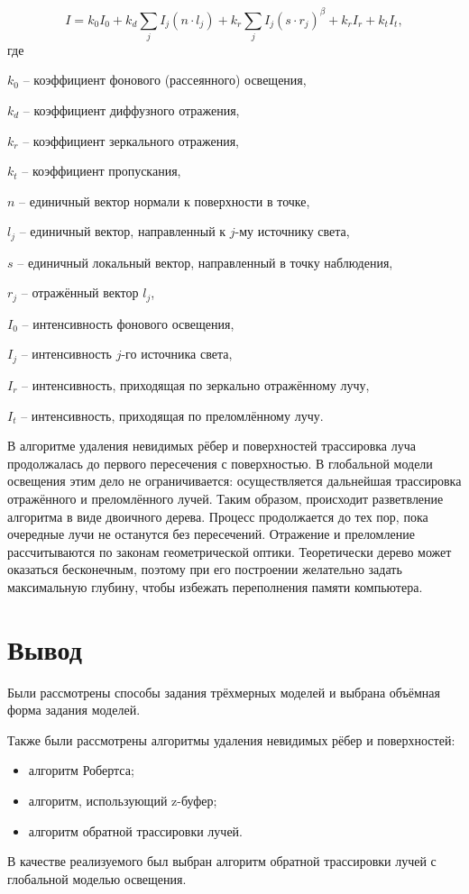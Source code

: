 \begin{equation}
	I = k_0I_0 + k_d\sum\limits_{j}^{}I_j(n \cdot l_j) + k_r\sum\limits_{j}^{}I_j(s \cdot r_j)^{\beta}+k_rI_r+k_tI_t,
\end{equation}
где

$k_0$ -- коэффициент фонового (рассеянного) освещения,

$k_d$ -- коэффициент диффузного отражения,

$k_r$ -- коэффициент зеркального отражения,

$k_t$ -- коэффициент пропускания,

$n$ -- единичный вектор нормали к поверхности в точке,

$l_j$ -- единичный вектор, направленный к $j$-му источнику света,

$s$ -- единичный локальный вектор, направленный в точку наблюдения,

$r_j$ -- отражённый вектор $l_j$,

$I_0$ -- интенсивность фонового освещения,

$I_j$ -- интенсивность $j$-го источника света,

$I_r$ --  интенсивность, приходящая по зеркально отражённому лучу,

$I_t$ -- интенсивность, приходящая по преломлённому лучу.

В алгоритме удаления невидимых рёбер и поверхностей трассировка луча продолжалась до первого пересечения с поверхностью. В глобальной модели освещения этим дело не ограничивается: осуществляется дальнейшая трассировка отражённого и преломлённого лучей. Таким образом, происходит разветвление алгоритма в виде двоичного дерева. Процесс продолжается до тех пор, пока очередные лучи не останутся без пересечений. Отражение и преломление рассчитываются по законам геометрической оптики. Теоретически дерево может оказаться бесконечным, поэтому при его построении желательно задать максимальную глубину, чтобы избежать переполнения памяти компьютера.

\section{Вывод}
Были рассмотрены способы задания трёхмерных моделей и выбрана объёмная форма задания моделей.

Также были рассмотрены алгоритмы удаления невидимых рёбер и поверхностей:
\begin{itemize}
	\item алгоритм Робертса;
	\item алгоритм, использующий z-буфер;
	\item алгоритм обратной трассировки лучей.
\end{itemize}
В качестве реализуемого был выбран алгоритм обратной трассировки лучей с глобальной моделью освещения.
 

